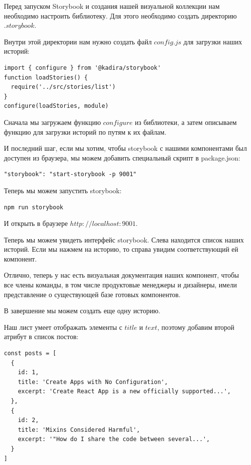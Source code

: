 Перед запуском Storybook и создания нашей визуальной коллекции нам необходимо настроить библиотеку. Для этого необходимо создать директорию $.storybook$. 

Внутри этой директории нам нужно создать файл $config.js$ для загрузки наших историй:

\begin{lstlisting}
import { configure } from '@kadira/storybook'
function loadStories() {
  require('../src/stories/list')
}
configure(loadStories, module)
\end{lstlisting}

Сначала мы загружаем функцию $configure$ из библиотеки, а затем описываем функцию для загрузки историй по путям к их файлам.

И последний шаг, если мы хотим, чтобы storybook с нашими компонентами был доступен из браузера, мы можем добавить специальный скрипт в package.json:

\begin{lstlisting}
"storybook": "start-storybook -p 9001"
\end{lstlisting}

Теперь мы можем запустить storybook:

\begin{lstlisting}
npm run storybook
\end{lstlisting}

И открыть в браузере $http://localhost:9001$.

Теперь мы можем увидеть интерфейс storybook. Слева находится список наших историй. Если мы нажмем на историю, то справа увидим соответствующий ей компонент.

Отлично, теперь у нас есть визуальная документация наших компонент, чтобы все члены команды, в том числе продуктовые менеджеры и дизайнеры, имели представление о существующей базе готовых компонентов.

В завершение мы можем создать еще одну историю.

Наш лист умеет отображать элементы с $title$ и $text$, поэтому добавим второй атрибут в список постов:

\begin{lstlisting}
const posts = [
  {
    id: 1,
    title: 'Create Apps with No Configuration',
    excerpt: 'Create React App is a new officially supported...',
  }, 
  {
    id: 2,
    title: 'Mixins Considered Harmful',
    excerpt: '"How do I share the code between several...',
  }
]
\end{lstlisting}

